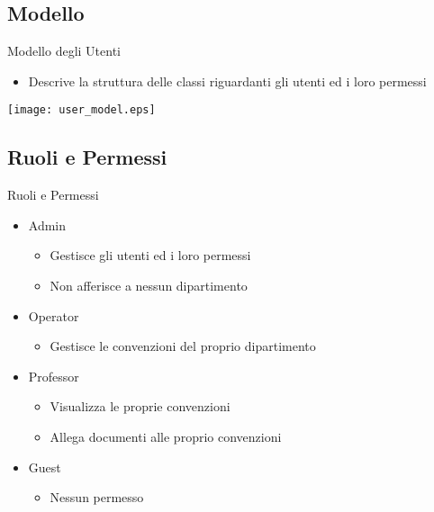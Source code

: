 \subsection{Modello}
\begin{frame}{Modello degli Utenti}
\begin{itemize}
\item Descrive la struttura delle classi riguardanti gli utenti ed i loro permessi
\end{itemize}	

\centering
\texttt{[image: user\_model.eps]}

\end{frame}

\subsection{Ruoli e Permessi}

\begin{frame}{Ruoli e Permessi}
\begin{itemize}
\item Admin
	\begin{itemize}
	\item Gestisce gli utenti ed i loro permessi
	\item Non afferisce a nessun dipartimento
	\end{itemize}
	
\vspace{0.8em}
\item Operator
	\begin{itemize}
	\item Gestisce le convenzioni del proprio dipartimento
	\end{itemize}

\vspace{0.8em}
\item Professor
	\begin{itemize}
	\item Visualizza le proprie convenzioni
	\item Allega documenti alle proprio convenzioni
	\end{itemize}

\vspace{0.8em}
\item Guest
	\begin{itemize}
	\item Nessun permesso
	\end{itemize}
\end{itemize}
\end{frame}


